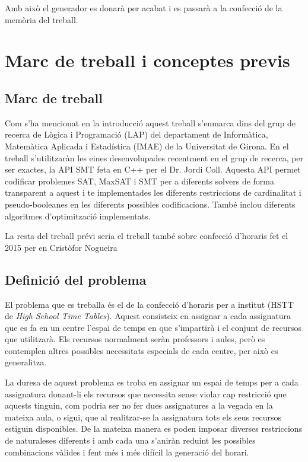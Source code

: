 \documentclass[11pt,a4paper,twoside]{report}
\begin{document}
  Amb això el generador es donarà per acabat i es passarà a la confecció de la memòria del treball. 






  \chapter{Marc de treball i conceptes previs}
  \section{Marc de treball}
    Com s'ha mencionat en la introducció aquest treball s'enmarca dins del grup de recerca de Lògica i Programació (LAP) del departament de Informàtica, Matemàtica Aplicada i Estadística (IMAE) de la Universitat de Girona. 
    En el treball s'utilitzaràn les eines desenvolupades recentment en el grup de recerca, per ser exactes, la API SMT feta en C++ per el Dr. Jordi Coll. 
    Aquesta API permet codificar problemes SAT, MaxSAT i SMT per a diferents solvers de forma transparent a aquest i te implementades les diferents restriccions de cardinalitat i pseudo-booleanes en les diferents possibles codificacions. 
    També inclou diferents algoritmes d'optimització implementats.

    La resta del treball prévi seria el treball també sobre confecció d'horaris fet el 2015 per en Cristòfor Nogueira\cite{treballCristo}

  \section{Definició del problema}
    El problema que es treballa és el de la confecció d'horaris per a institut (HSTT de \textit{High School Time Tables}). 
    Aquest consisteix en assignar a cada assignatura que es fa en un centre l'espai de temps en que s'impartirà i el conjunt de recursos que utilitzarà. 
    Els recursos normalment seràn professors i aules, però es contemplen altres possibles necessitats especials de cada centre, per això es generalitza.

    La duresa de aquest problema es troba en assignar un espai de temps per a cada assignatura donant-li els recursos que necessita sense violar cap restricció que aquests tinguin, 
    com podria ser no fer dues assignatures a la vegada en la mateixa aula, o sigui, que al realitzar-se la assignatura tots els seus recursos estiguin disponibles.  
    De la mateixa manera es poden imposar diverses restriccions de naturaleses diferents i amb cada una s'aniràn reduint les possibles combinacions vàlides i fent més i més difícil la generació del horari.
\end{document}
